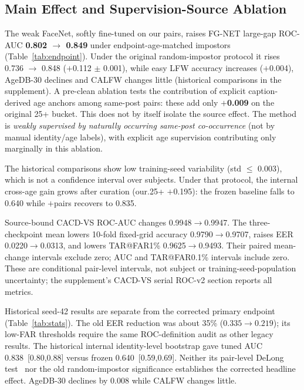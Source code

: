 \documentclass[journal]{IEEEtran}
\begin{document}
\subsection{Main Effect and Supervision-Source Ablation}\label{sec:res-main}
The weak FaceNet, softly fine-tuned on our pairs, raises FG-NET large-gap ROC-AUC \textbf{0.802 $\rightarrow$ 0.849} under endpoint-age-matched impostors (Table~\ref{tab:endpoint}). Under the original random-impostor protocol it rises 0.736 $\rightarrow$ 0.848 ($+$0.112 $\pm$ 0.001), while easy LFW accuracy increases ($+$0.004), AgeDB-30 declines and CALFW changes little (historical comparisons in the supplement). A pre-clean ablation tests the contribution of explicit caption-derived age anchors among same-post pairs: these add only \textbf{$+$0.009} on the original 25+ bucket. This does not by itself isolate the source effect. The method is \emph{weakly supervised by naturally occurring same-post co-occurrence} (not by manual identity/age labels), with explicit age supervision contributing only marginally in this ablation.


The historical comparisons show low training-seed variability (std $\leq$ 0.003), which is not a confidence interval over subjects. Under that protocol, the internal cross-age gain grows after curation (our.25+ $+$0.195): the frozen baseline falls to 0.640 while $+$pairs recovers to 0.835.

Source-bound CACD-VS ROC-AUC changes 0.9948$\to$0.9947. The three-checkpoint mean lowers 10-fold fixed-grid accuracy 0.9790$\to$0.9707, raises EER 0.0220$\to$0.0313, and lowers TAR@FAR1\% 0.9625$\to$0.9493. Their paired mean-change intervals exclude zero; AUC and TAR@FAR0.1\% intervals include zero. These are conditional pair-level intervals, not subject or training-seed-population uncertainty; the supplement's CACD-VS serial ROC-v2 section reports all metrics.

Historical seed-42 results are separate from the corrected primary endpoint (Table~\ref{tab:stats}). The old EER reduction was about 35\% ($0.335\to0.219$); its low-FAR thresholds require the same ROC-definition audit as other legacy results. The historical internal identity-level bootstrap gave tuned AUC 0.838~[0.80,0.88] versus frozen 0.640~[0.59,0.69]. Neither its pair-level DeLong test~\cite{delong1988} nor the old random-impostor significance establishes the corrected headline effect. AgeDB-30 declines by 0.008 while CALFW changes little.
\end{document}

